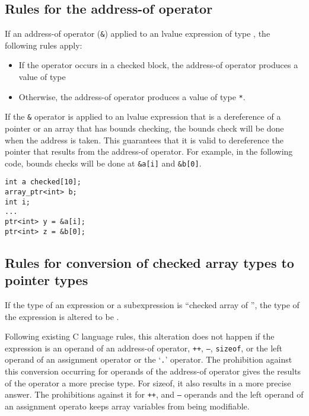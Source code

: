 \subsection{Rules for the address-of operator}

If an address-of operator (\texttt{\&}) applied to an lvalue expression
of type , the following rules apply:

\begin{itemize}
\item
  If the operator occurs in a checked block, the address-of operator
  produces a value of type
  \ptrT
\item
  Otherwise, the address-of operator produces a value of type 
  \texttt{*}.
\end{itemize}

If the \texttt{\&} operator is applied to an lvalue expression that is a
dereference of a pointer or an array that has bounds checking, the
bounds check will be done when the address is taken. This guarantees
that it is valid to dereference the pointer that results from the
address-of operator. For example, in the following code, bounds checks
will be done at \texttt{\&a[i]} and \texttt{\&b[0]}.

\begin{verbatim}
int a checked[10];
array_ptr<int> b;
int i;
...
ptr<int> y = &a[i];
ptr<int> z = &b[0];
\end{verbatim}

\subsection{Rules for conversion of checked array types to pointer types}

If the type of an expression or a subexpression is ``checked array of
'', the type of the expression is altered to be
\arrayptrT.

Following existing C language rules, this alteration does not happen if
the expression is an operand of an address-of operator, \texttt{++},
\texttt{--}, \texttt{sizeof}, or the left operand of an assignment
operator or the `\texttt{.}' operator. The prohibition against this
conversion occurring for operands of the address-of operator gives the
results of the operator a more precise type. For sizeof, it also results
in a more precise answer. The prohibitions against it for \texttt{++}, and
\texttt{--} operands and the left operand of an assignment operato keeps array
variables from being modifiable.

